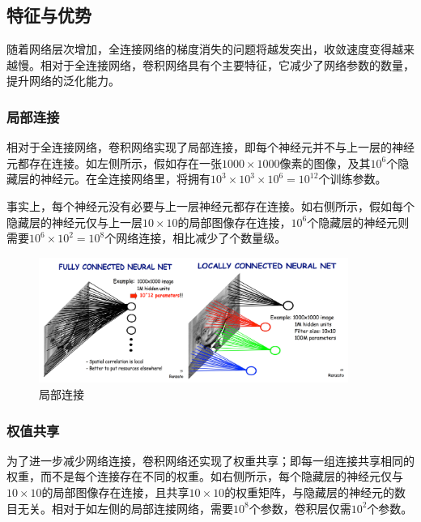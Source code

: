 \begin{content}

\subsection{特征与优势}

随着网络层次增加，全连接网络的梯度消失的问题将越发突出，收敛速度变得越来越慢。相对于全连接网络，卷积网络具有个主要特征，它减少了网络参数的数量，提升网络的泛化能力。

\subsubsection{局部连接}

相对于全连接网络，卷积网络实现了局部连接，即每个神经元并不与上一层的神经元都存在连接。如左侧所示，假如存在一张$ 1000 \times 1000 $像素的图像，及其$ 10^6 $个隐藏层的神经元。在全连接网络里，将拥有$ 10^3 \times 10^3 \times 10^6 = 10^12 $个训练参数。

事实上，每个神经元没有必要与上一层神经元都存在连接。如右侧所示，假如每个隐藏层的神经元仅与上一层$ 10 \times 10 $的局部图像存在连接，$ 10^6 $个隐藏层的神经元则需要$ 10^6 \times 10^2 = 10^8$个网络连接，相比减少了个数量级。

\begin{figure}[H]
\centering
\includegraphics[width=0.9\textwidth]{figures/mnist-conv-local-conn.png}
\caption{局部连接}
 \label{fig:mnist-conv-local-conn}
\end{figure}

\subsubsection{权值共享}

为了进一步减少网络连接，卷积网络还实现了权重共享；即每一组连接共享相同的权重，而不是每个连接存在不同的权重。如右侧所示，每个隐藏层的神经元仅与$ 10 \times 10 $的局部图像存在连接，且共享$ 10 \times 10 $的权重矩阵，与隐藏层的神经元的数目无关。相对于如左侧的局部连接网络，需要$10^8$个参数，卷积层仅需$10^2$个参数。


\end{content}
